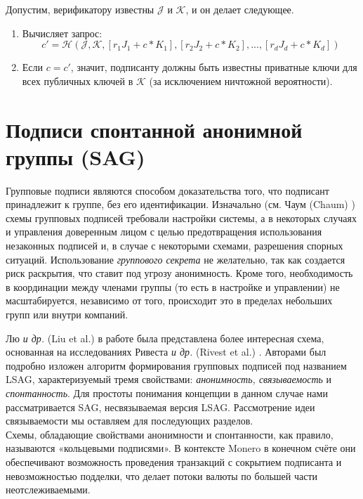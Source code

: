 Допустим, верификатору известны $\mathcal{J}$ и $\mathcal{K}$, и он делает следующее.

\begin{enumerate}
	\item Вычисляет запрос:\vspace{.175cm}
	\[c' = \mathcal{H}(\mathcal{J},\mathcal{K},[r_1 J_1 + c*K_1],[r_2 J_2 + c*K_2],...,[r_d J_d + c*K_d])\]
	\item Если $c = c'$, значит, подписанту должны быть известны приватные ключи для всех публичных ключей в $\mathcal{K}$ (за исключением ничтожной вероятности).
\end{enumerate}



\section{Подписи спонтанной анонимной группы (SAG)}
\label{SAG_section}

Групповые подписи являются способом доказательства того, что подписант принадлежит к группе, без его идентификации. Изначально (см. Чаум (Chaum) \cite{Chaum:1991:GS:1754868.1754897}) схемы групповых подписей требовали настройки системы, а в некоторых случаях и управления доверенным лицом с целью предотвращения использования незаконных подписей и, в случае с некоторыми схемами, разрешения спорных ситуаций. Использование {\em группового секрета} не желательно, так как создается риск раскрытия, что ставит под угрозу анонимность. Кроме того, необходи\-мость в координации между членами группы (то есть в настройке и управлении) не масштаби\-руется, независимо от того, происходит это в пределах небольших групп или внутри компаний.

Лю {\em и др.} (Liu et al.) в работе \cite{Liu2004} была представлена более интересная схема, основанная на исследованиях Ривеста {\em и др.} (Rivest et al.) \cite{rivest-leak-secret}. Авторами был подробно изложен алгоритм формирования групповых подписей под названием LSAG, характеризуемый тремя свойствами: {\em анонимность, связываемость} и {\em спонтанность}. Для простоты понимания кон\-цепции в данном случае нами рассматривается SAG, несвязываемая версия LSAG. Рассмотре\-ние идеи связываемости мы оставляем для последующих разделов.
\\

Схемы, обладающие свойствами анонимности и спонтанности, как правило, называются «коль\-цевыми подписями». В контексте Monero в конечном счёте они обеспечивают возможность проведения транзакций с сокрытием подписанта и невозможностью подделки, что делает потоки валюты по большей части неотслеживаемыми.


